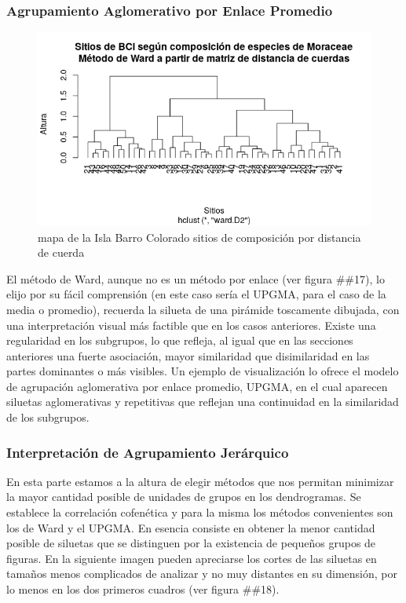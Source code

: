 \documentclass[11pt,]{article}
\begin{document}
\subsubsection{Agrupamiento Aglomerativo por Enlace
Promedio}\label{agrupamiento-aglomerativo-por-enlace-promedio}

\begin{figure}
\centering
\includegraphics[width=1.00000\textwidth]{sitios_metodo_ward.png}
\caption{mapa de la Isla Barro Colorado sitios de composición por
distancia de cuerda \label{fig:bci_map}}
\end{figure}

El método de Ward, aunque no es un método por enlace (ver figura
\#\#17), lo elijo por su fácil comprensión (en este caso sería el UPGMA,
para el caso de la media o promedio), recuerda la silueta de una
pirámide toscamente dibujada, con una interpretación visual más factible
que en los casos anteriores. Existe una regularidad en los subgrupos, lo
que refleja, al igual que en las secciones anteriores una fuerte
asociación, mayor similaridad que disimilaridad en las partes dominantes
o más visibles. Un ejemplo de visualización lo ofrece el modelo de
agrupación aglomerativa por enlace promedio, UPGMA, en el cual aparecen
siluetas aglomerativas y repetitivas que reflejan una continuidad en la
similaridad de los subgrupos.

\subsubsection{Interpretación de Agrupamiento
Jerárquico}\label{interpretaciuxf3n-de-agrupamiento-jeruxe1rquico}

En esta parte estamos a la altura de elegir métodos que nos permitan
minimizar la mayor cantidad posible de unidades de grupos en los
dendrogramas. Se establece la correlación cofenética y para la misma los
métodos convenientes son los de Ward y el UPGMA. En esencia consiste en
obtener la menor cantidad posible de siluetas que se distinguen por la
existencia de pequeños grupos de figuras. En la siguiente imagen pueden
apreciarse los cortes de las siluetas en tamaños menos complicados de
analizar y no muy distantes en su dimensión, por lo menos en los dos
primeros cuadros (ver figura \#\#18).
\end{document}
